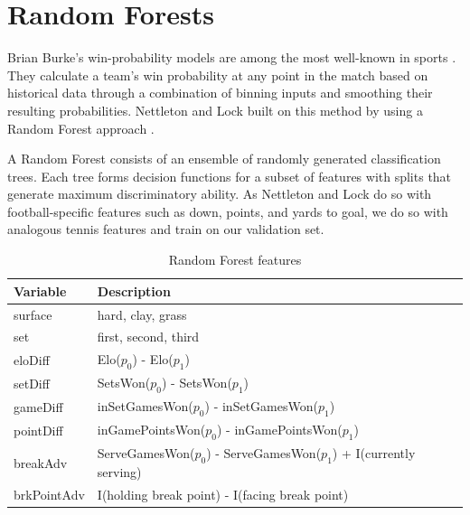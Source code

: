 \documentclass[chapterprefix=false]{report}
\begin{document}



\section{Random Forests}
Brian Burke's win-probability models are among the most well-known in sports \citep{WPexp}. They calculate a team's win probability at any point in the match based on historical data through a combination of binning inputs and smoothing their resulting probabilities. Nettleton and Lock built on this method by using a Random Forest approach \citep{LockandNettleton2014}.

A Random Forest consists of an ensemble of randomly generated classification trees. Each tree forms decision functions for a subset of features with splits that generate maximum discriminatory ability. As Nettleton and Lock do so with football-specific features such as down, points, and yards to goal, we do so with analogous tennis features and train on our validation set.



\begin{table}[H]
\centering
\caption{Random Forest features}
\label{my-label}
\begin{tabular}{ll}
 \hline
 Variable & Description \\
 \hline
 surface & hard, clay, grass \\
 \hline
 set &  first, second, third \\
 \hline
 eloDiff &  Elo($p_0$) - Elo($p_1$) \\
 \hline
  setDiff &  SetsWon($p_0$) - SetsWon($p_1$)\\
 \hline
 gameDiff &  inSetGamesWon($p_0$) - inSetGamesWon($p_1$)\\
 \hline
 pointDiff &  inGamePointsWon($p_0$) - inGamePointsWon($p_1$)\\
 \hline
  breakAdv &  ServeGamesWon($p_0$) - ServeGamesWon($p_1$) + I(currently serving)\\
 \hline
 brkPointAdv & I(holding break point) - I(facing break point)\\
 \hline
\end{tabular}
\end{table}
\end{document}
